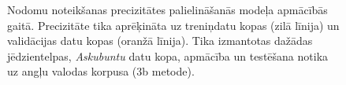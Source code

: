 \begin{figure}[h] 
   \centering
   \caption{Nodomu noteikšanas precizitātes palielināšanās modeļa apmācībās gaitā. Precizitāte tika aprēķināta uz treniņdatu kopas (zilā līnija) un validācijas datu kopas (oranžā līnija). Tika izmantotas dažādas jēdzientelpas, \textit{Askubuntu} datu kopa, apmācība un testēšana notika uz angļu valodas korpusa (3b metode).} 
   \label{fig:askubuntu-bert-xlm-en}
\end{figure}


